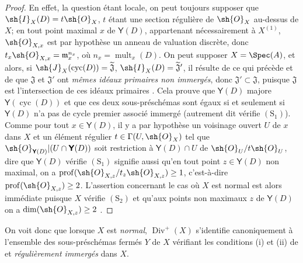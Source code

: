 \begin{proof}
En effet, la question étant locale, on peut toujours supposer que $\sh{I}_X(D)=t\sh{O}_X$, $t$ étant une section régulière de $\sh{O}_X$ au-dessus de $X$;
en tout point maximal $x$ de $\boldsymbol{\mathsf{Y}}(D)$, appartenant nécessairement à $X^{(1)}$, $\sh{O}_{X,x}$ est par hypothèse un anneau de valuation discrète, donc $t_x\sh{O}_{X,x}=\mathfrak{m}_x^{n_x}$, où $n_x=\operatorname{mult}_x(D)$.
On peut supposer $X=\Spec(A)$, et alors, si $\sh{J}_X(\operatorname{cyc}(D))=\widetilde{\mathfrak{J}}$, $\sh{I}_X(D)=\widetilde{\mathfrak{J}}'$, il résulte de ce qui précède et de  que $\mathfrak{J}$ et $\mathfrak{J}'$ ont \emph{mêmes idéaux primaires non immergés}, donc $\mathfrak{J}'\subset\mathfrak{J}$, puisque $\mathfrak{J}$ est l'intersection
de ces idéaux primaires .
Cela prouve que $\boldsymbol{\mathsf{Y}}(D)$ majore $\boldsymbol{\mathsf{Y}}(\operatorname{cyc}(D))$ et que ces deux sous-préschémas sont égaux si et seulement si $\boldsymbol{\mathsf{Y}}(D)$ n'a pas de cycle premier associé immergé (autrement dit vérifie $(\mathrm{S}_1)$).
Comme pour tout $x\in\boldsymbol{\mathsf{Y}}(D)$, il y a par hypothèse un voisinage ouvert $U$ de $x$ dans $X$ et un élément régulier $t\in\Gamma(U,\sh{O}_X)$ tel que $\sh{O}_{\boldsymbol{\mathsf{Y}}(D)}|(U\cap\boldsymbol{\mathsf{Y}}(D))$ soit restriction à $\boldsymbol{\mathsf{Y}}(D)\cap U$ de $\sh{O}_U/t\sh{O}_U$, dire que $\boldsymbol{\mathsf{Y}}(D)$ vérifie $(\mathrm{S}_1)$ signifie aussi qu'en tout point $z\in\boldsymbol{\mathsf{Y}}(D)$ non maximal, on a $\operatorname{prof}(\sh{O}_{X,z}/t_z\sh{O}_{X,z})\geq1$, c'est-à-dire  $\operatorname{prof}(\sh{O}_{X,z})\geq2$.
L'assertion concernant le cas où $X$ est normal est alors immédiate puisque $X$ vérifie $(\mathrm{S}_2)$ et qu'aux points non maximaux $z$ de $\boldsymbol{\mathsf{Y}}(D)$ on a $\dim(\sh{O}_{X,z})\geq2$ .
\end{proof}

\begin{env}[21.7.3.1]
\label{IV.21.7.3.1}
On voit donc que lorsque $X$ est \emph{normal}, $\operatorname{Div}^+(X)$ s'identifie canoniquement à l'ensemble des sous-préschémas fermés $Y$ de $X$ vérifiant les conditions (i) et (ii) de  et \emph{régulièrement immergés} dans $X$.
\end{env}

